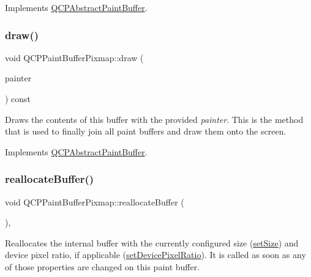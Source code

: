Implements \mbox{\hyperlink{class_q_c_p_abstract_paint_buffer_a9e253f4541dfc01992b77e8830bd7722}{Q\+C\+P\+Abstract\+Paint\+Buffer}}.

\mbox{\label{class_q_c_p_paint_buffer_pixmap_af7bfc685e56a0a9329e57cd9a265eb74}} 
\subsubsection{\texorpdfstring{draw()}{draw()}}
{\footnotesize\ttfamily void Q\+C\+P\+Paint\+Buffer\+Pixmap\+::draw (\begin{DoxyParamCaption}\item[{\mbox{\hyperlink{class_q_c_p_painter}{Q\+C\+P\+Painter}} $\ast$}]{painter }\end{DoxyParamCaption}) const\hspace{0.3cm}{\ttfamily [virtual]}}

Draws the contents of this buffer with the provided {\itshape painter}. This is the method that is used to finally join all paint buffers and draw them onto the screen. 

Implements \mbox{\hyperlink{class_q_c_p_abstract_paint_buffer_afb998c7525e3ae37d9d2d46c7aaf461a}{Q\+C\+P\+Abstract\+Paint\+Buffer}}.

\mbox{\label{class_q_c_p_paint_buffer_pixmap_ad49f3205ba3463b1c44f8db3cfcc90f0}} 
\subsubsection{\texorpdfstring{reallocateBuffer()}{reallocateBuffer()}}
{\footnotesize\ttfamily void Q\+C\+P\+Paint\+Buffer\+Pixmap\+::reallocate\+Buffer (\begin{DoxyParamCaption}{ }\end{DoxyParamCaption})\hspace{0.3cm}{\ttfamily [protected]}, {\ttfamily [virtual]}}

Reallocates the internal buffer with the currently configured size (\mbox{\hyperlink{class_q_c_p_abstract_paint_buffer_a8b68c3cd36533f1a4a23b5ce8cd66f01}{set\+Size}}) and device pixel ratio, if applicable (\mbox{\hyperlink{class_q_c_p_abstract_paint_buffer_a555eaad5d5c806420ff35602a1bb68fa}{set\+Device\+Pixel\+Ratio}}). It is called as soon as any of those properties are changed on this paint buffer.

